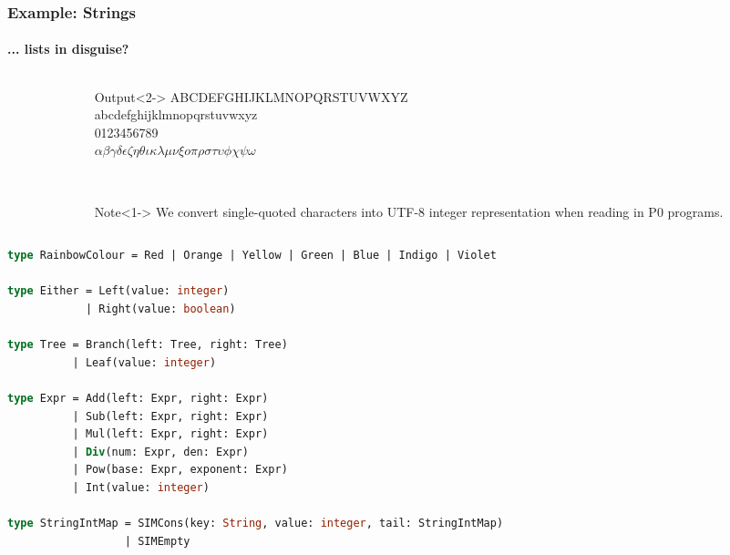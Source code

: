 \documentclass{beamer}
\newcommand\omicron{o}
\begin{document}
\begin{frame}
\frametitle{Example: Strings}
\framesubtitle{... lists in disguise?}
    \begin{columns}[T,onlytextwidth]
        \begin{column}{.65\textwidth}
            \begin{minipage}{\textwidth}
                \usebox{\exampleString}
            \end{minipage}
        \end{column}
        \begin{column}{.35\textwidth}
            \begin{onlyenv}
                \begin{minipage}{\textwidth}
                    \begin{block}{Output}<2->\tiny
                        ABCDEFGHIJKLMNOPQRSTUVWXYZ\\
                        abcdefghijklmnopqrstuvwxyz\\
                        0123456789\\
                        $\alpha\beta\gamma\delta\epsilon\zeta\eta\theta\iota\kappa\lambda\mu\nu\xi\omicron\pi\rho\sigma\tau\upsilon\phi\chi\psi\omega$
                    \end{block}
                    
                    \ \\
                    
                    \begin{block}{Note}<1->\tiny
                        We convert single-quoted characters into UTF-8 integer representation when reading in P0 programs.
                    \end{block}
                \end{minipage}
            \end{onlyenv}
        \end{column}
    \end{columns}
\end{frame}



\begin{lrbox}{\exampleImagination}
\begin{lstlisting}[language=Pascal,basicstyle=\tiny]
type RainbowColour = Red | Orange | Yellow | Green | Blue | Indigo | Violet

type Either = Left(value: integer)
            | Right(value: boolean)

type Tree = Branch(left: Tree, right: Tree)
          | Leaf(value: integer)

type Expr = Add(left: Expr, right: Expr)
          | Sub(left: Expr, right: Expr)
          | Mul(left: Expr, right: Expr)
          | Div(num: Expr, den: Expr)
          | Pow(base: Expr, exponent: Expr)
          | Int(value: integer)

type StringIntMap = SIMCons(key: String, value: integer, tail: StringIntMap)
                  | SIMEmpty

\end{lstlisting}
\end{lrbox}
\end{document}
